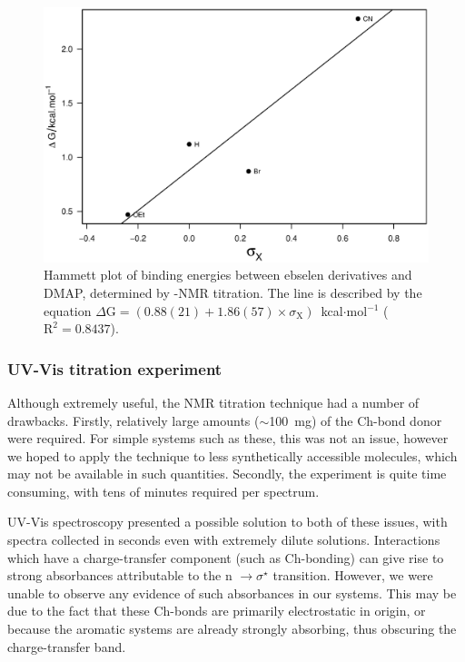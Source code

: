 \begin{refsection}
\begin{figure}
    \centering
    \includegraphics[width=0.75\linewidth]{Figures/hammett-dmap-nmr.eps}
    \caption{Hammett plot of binding energies between ebselen derivatives and DMAP, determined by -NMR titration. The line is described by the equation $\Delta\mathrm{G} = (0.88(21) + 1.86(57) \times \sigma_{\mathrm{X}})$~kcal$\cdot$mol$^{-1}$ ($\mathrm{R}^2 = 0.8437$).}
    \label{fig:hammett-dmap-nmr}
\end{figure}


\subsubsection{UV-Vis titration experiment}
Although extremely useful, the NMR titration technique had a number of drawbacks.
Firstly, relatively large amounts ($\sim$100~mg) of the Ch-bond donor were required.
For simple systems such as these, this was not an issue, however we hoped to apply the technique to less synthetically accessible molecules, which may not be available in such quantities.
Secondly, the experiment is quite time consuming, with tens of minutes required per spectrum.

UV-Vis spectroscopy presented a possible solution to both of these issues, with spectra collected in seconds even with extremely dilute solutions.
Interactions which have a charge-transfer component (such as Ch-bonding) can give rise to strong absorbances attributable to the n $\rightarrow \sigma^{\star}$ transition.\autocite{Blackstock1987}
However, we were unable to observe any evidence of such absorbances in our systems.
This may be due to the fact that these Ch-bonds are primarily electrostatic in origin, or because the aromatic systems are already strongly absorbing, thus obscuring the charge-transfer band.


\end{refsection}
